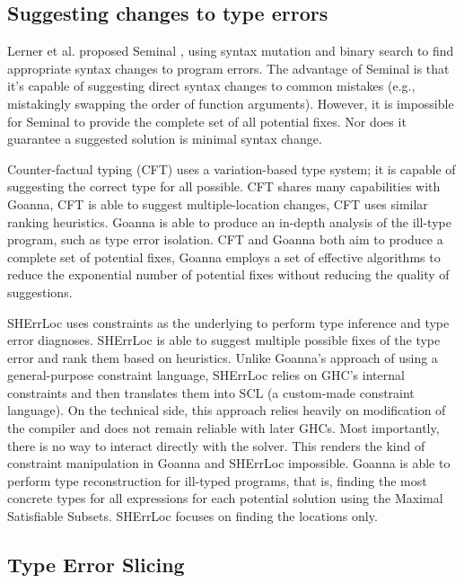 \documentclass[pdflatex,sn-nature,Numbered]{sn-jnl}%
\begin{document}
    \subsection{Suggesting changes to type errors}
   Lerner et al. proposed Seminal \cite{Lerner2007-mu}, using syntax mutation and binary search to find appropriate syntax changes to program errors. The advantage of Seminal is that it's capable of suggesting direct syntax changes to common mistakes (e.g., mistakingly swapping the order of function arguments). However, it is impossible for Seminal to provide the complete set of all potential fixes. Nor does it guarantee a suggested solution is minimal syntax change.
   
   Counter-factual typing (CFT) \cite{Chen2014-dz,Chen2020-ad} uses a variation-based type system; it is capable of suggesting the correct type for all possible. CFT shares many capabilities with Goanna, CFT is able to suggest multiple-location changes, CFT uses similar ranking heuristics. Goanna is able to produce an in-depth analysis of the ill-type program, such as type error isolation. CFT and Goanna both aim to produce a complete set of potential fixes, Goanna employs a set of effective algorithms to reduce the exponential number of potential fixes without reducing the quality of suggestions. 
   
   SHErrLoc \cite{Zhang2015-xy} uses constraints as the underlying to perform type inference and type error diagnoses. SHErrLoc is able to suggest multiple possible fixes of the type error and rank them based on heuristics. Unlike Goanna's approach of using a general-purpose constraint language, SHErrLoc relies on GHC's internal constraints and then translates them into SCL (a custom-made constraint language). On the technical side, this approach relies heavily on modification of the compiler and does not remain reliable with later GHCs. Most importantly, there is no way to interact directly with the solver. This renders the kind of constraint manipulation in Goanna and SHErrLoc impossible. Goanna is able to perform type reconstruction for ill-typed programs, that is, finding the most concrete types for all expressions for each potential solution using the Maximal Satisfiable Subsets. SHErrLoc focuses on finding the locations only.


\subsection{Type Error Slicing}
\end{document}
